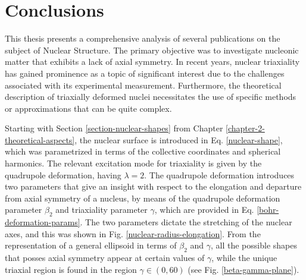 \chapter{Conclusions}
\label{chapter-8-conclusions}

This thesis presents a comprehensive analysis of several publications on the subject of Nuclear Structure. The primary objective was to investigate nucleonic matter that exhibits a lack of axial symmetry. In recent years, nuclear triaxiality has gained prominence as a topic of significant interest due to the challenges associated with its experimental measurement. Furthermore, the theoretical description of triaxially deformed nuclei necessitates the use of specific methods or approximations that can be quite complex.


Starting with Section \ref{section-nuclear-shapes} from Chapter \ref{chapter-2-theoretical-aspects}, the nuclear surface is introduced in Eq. \eqref{nuclear-shape}, which was parametrized in terms of the collective coordinates and spherical harmonics. The relevant excitation mode for triaxiality is given by the quadrupole deformation, having $\lambda=2$. The quadrupole deformation introduces two parameters that give an insight with respect to the elongation and departure from axial symmetry of a nucleus, by means of the quadrupole deformation parameter $\beta_2$ and triaxiality parameter $\gamma$, which are provided in Eq. \eqref{bohr-deformation-params}. The two parameters dictate the stretching of the nuclear axes, and this was shown in Fig. \ref{nuclear-radius-elongation}. From the representation of a general ellipsoid in terms of $\beta_2$ and $\gamma$, all the possible shapes that posses axial symmetry appear at certain values of $\gamma$, while the unique triaxial region is found in the region $\gamma\in(0,60)$ (see Fig. \ref{beta-gamma-plane}).

